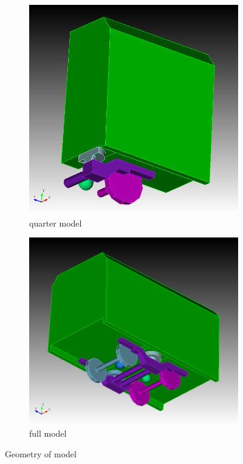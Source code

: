 \begin{figure}[H]
	\centering
	\begin{subfigure}[b]{0.4\textwidth}
		\centering
		\includegraphics[width=0.9\linewidth]{fig/chap4/geometry/one_fourth_model.png}
		\caption{quarter model}
	\end{subfigure}
	\hfill
	\begin{subfigure}[b]{0.4\textwidth}
		\centering
		\includegraphics[width=\linewidth]{fig/chap4/geometry/initial_model_2.png}
		\caption{full model}
	\end{subfigure}
	\caption{Geometry of model}
\end{figure}



